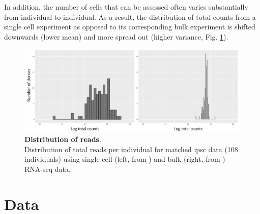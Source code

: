 In addition, the number of cells that can be assessed often varies substantially from individual to individual.
As a result, the distribution of total counts from a single cell experiment as opposed to its corresponding bulk experiment is shifted downwards (lower mean) and more spread out (higher variance, Fig. \ref{fig:sc_bulk_counts}).

\begin{figure}[h]
\centering
\includegraphics[width=13cm]{Chapter3/Fig/count_distribution_sc_vs_bulk.png}
\caption[Distribution of reads]{\textbf{Distribution of reads}.\\
Distribution of total reads per individual for matched \gls{ipsc} data (108 individuals) using single cell (left, from \cite{cuomo2020single}) and bulk (right, from \cite{mirauta2018population}) RNA-seq data.}
\label{fig:sc_bulk_counts}
\end{figure}


\newpage

\section{Data}

